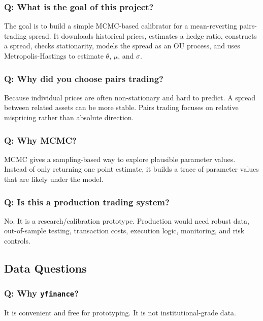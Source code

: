 \documentclass[11pt]{article}
\newcommand{\code}[1]{\texttt{#1}}
\begin{document}
\subsubsection{Q: What is the goal of this project?}

The goal is to build a simple MCMC-based calibrator for a mean-reverting
pairs-trading spread. It downloads historical prices, estimates a hedge ratio,
constructs a spread, checks stationarity, models the spread as an OU process,
and uses Metropolis-Hastings to estimate $\theta$, $\mu$, and $\sigma$.

\subsubsection{Q: Why did you choose pairs trading?}

Because individual prices are often non-stationary and hard to predict. A spread
between related assets can be more stable. Pairs trading focuses on relative
mispricing rather than absolute direction.

\subsubsection{Q: Why MCMC?}

MCMC gives a sampling-based way to explore plausible parameter values. Instead
of only returning one point estimate, it builds a trace of parameter values that
are likely under the model.

\subsubsection{Q: Is this a production trading system?}

No. It is a research/calibration prototype. Production would need robust data,
out-of-sample testing, transaction costs, execution logic, monitoring, and risk
controls.

\subsection{Data Questions}

\subsubsection{Q: Why \code{yfinance}?}

It is convenient and free for prototyping. It is not institutional-grade data.
\end{document}
